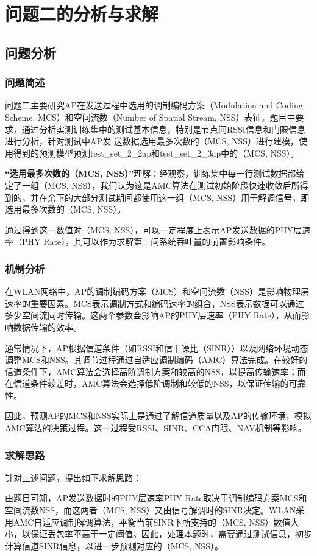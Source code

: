 \documentclass[bwprint]{gmcmthesis}
\begin{document}
\newpage
\section{问题二的分析与求解}
\subsection{问题分析}
\subsubsection{问题简述}
问题二主要研究AP在发送过程中选用的调制编码方案（Modulation and Coding Scheme, MCS）和空间流数（Number of Spatial Stream, NSS）表征。题目中要求，通过分析实测训练集中的测试基本信息，特别是节点间RSSI信息和门限信息进行分析，针对测试中AP发
送数据选用最多次数的（MCS, NSS）\cite{rn5}进行建模，使用得到的预测模型预测test\_set\_2\_2ap和test\_set\_2\_3ap中的（MCS, NSS）。

\textbf{“选用最多次数的（MCS, NSS）”}理解：经观察，训练集中每一行测试数据都给定了一组（MCS, NSS），我们认为这是AMC算法在测试初始阶段快速收敛后所得到的，并在余下的大部分测试期间都使用这一组（MCS, NSS）用于解调信号，即选用最多次数的（MCS, NSS）。

通过得到这一数值对（MCS, NSS），可以一定程度上表示AP发送数据的PHY层速率（PHY Rate），其可以作为求解第三问系统吞吐量的前置影响条件。

\subsubsection{机制分析}
在WLAN网络中，AP的调制编码方案（MCS）和空间流数（NSS）是影响物理层速率的重要因素。MCS表示调制方式和编码速率的组合，NSS表示数据可以通过多少空间流同时传输。这两个参数会影响AP的PHY层速率（PHY Rate），从而影响数据传输的效率。

通常情况下，AP根据信道条件（如RSSI和信干噪比（SINR））以及网络环境动态调整MCS和NSS。其调节过程通过自适应调制编码（AMC）算法完成。在较好的信道条件下，AMC算法会选择高阶调制方案和较高的NSS，以提高传输速率；而在信道条件较差时，AMC算法会选择低阶调制和较低的NSS，以保证传输的可靠性。

因此，预测AP的MCS和NSS实际上是通过了解信道质量以及AP的传输环境，模拟AMC算法的决策过程。这一过程受RSSI、SINR、CCA门限、NAV机制等影响。
\subsubsection{求解思路}
针对上述问题，提出如下求解思路：

由题目可知，AP发送数据时的PHY层速率PHY Rate取决于调制编码方案MCS和空间流数NSS，而这两者（MCS, NSS）又由信号解调时的SINR决定。WLAN采用AMC自适应调制解调算法，平衡当前SINR下所支持的（MCS, NSS）数值大小，以保证丢包率不高于一定阈值。因此，处理本题时，需要通过测试信息，初步计算信道SINR信息，以进一步预测对应的（MCS, NSS）。
\end{document}

